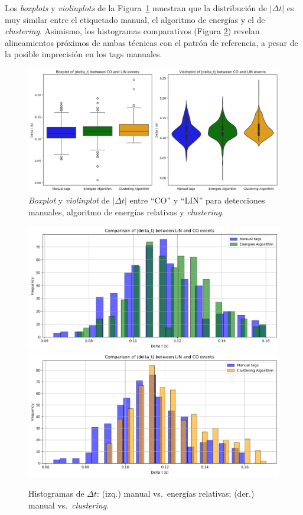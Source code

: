 Los \textit{boxplots} y \textit{violinplots} de la Figura~\ref{fig:dt_box_violin} 
muestran que la distribución de \(|\Delta t|\) es muy similar 
entre el etiquetado manual, el algoritmo de energías y el de 
\textit{clustering}. Asimismo, los histogramas comparativos 
(Figura \ref{fig:histograms_deltas}) revelan 
alineamientos próximos de ambas técnicas con el patrón de 
referencia, a pesar de la posible imprecisión en los tags 
manuales.  

\begin{figure}[ht]
  \centering
  \includegraphics[width=\linewidth]{Graphics/boxplot_and_violin.png}
  \caption{\textit{Boxplot} y \textit{violinplot} de \(|\Delta t|\) entre “CO” y “LIN” para detecciones manuales, algoritmo de energías relativas y \textit{clustering}.}
  \label{fig:dt_box_violin}
\end{figure}

\begin{figure}[ht]
  \centering
  \includegraphics[width=0.48\linewidth]{Graphics/histogram_energies_tags.png}
  \includegraphics[width=0.48\linewidth]{Graphics/histogram_clustering_tags.png}
  \caption{Histogramas de \(\Delta t\): (izq.) manual vs.\ energías relativas; (der.) manual vs.\ \textit{clustering}.}
  \label{fig:histograms_deltas}
\end{figure}

